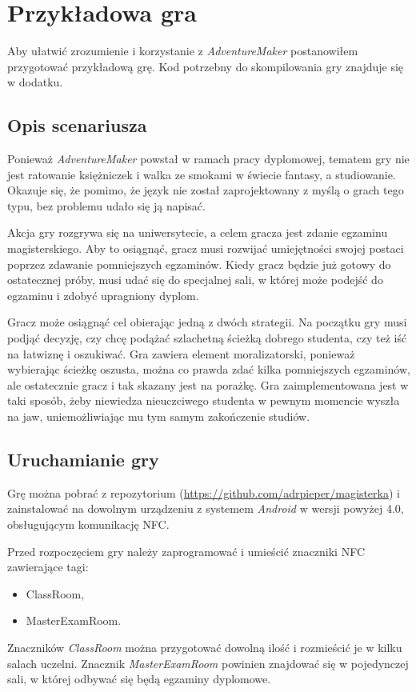 \documentclass[openright]{xmgr}
\begin{document}
\chapter{Przykładowa gra}
Aby ułatwić zrozumienie i korzystanie z \textit{AdventureMaker} postanowiłem przygotować przykładową grę. Kod potrzebny do skompilowania gry znajduje się w dodatku.

\section{Opis scenariusza}

Ponieważ \textit{AdventureMaker} powstał w ramach pracy dyplomowej, tematem gry nie jest ratowanie księżniczek i walka ze smokami w świecie fantasy, a studiowanie. Okazuje się, że pomimo, że język nie został zaprojektowany z myślą o grach tego typu, bez problemu udało się ją napisać.

Akcja gry rozgrywa się na uniwersytecie, a celem gracza jest zdanie egzaminu magisterskiego. Aby to osiągnąć, gracz musi rozwijać umiejętności swojej postaci poprzez zdawanie pomniejszych egzaminów. Kiedy gracz będzie już gotowy do ostatecznej próby, musi udać się do specjalnej sali, w której może podejść do egzaminu i zdobyć upragniony dyplom.

Gracz może osiągnąć cel obierając jedną z dwóch strategii. Na początku gry musi podjąć decyzję, czy chcę podążać szlachetną ścieżką dobrego studenta, czy też iść na łatwiznę i oszukiwać. Gra zawiera element moralizatorski, ponieważ wybierając ścieżkę oszusta, można co prawda zdać kilka pomniejszych egzaminów, ale ostatecznie gracz i tak skazany jest na porażkę. Gra zaimplementowana jest w taki sposób, żeby niewiedza nieuczciwego studenta w pewnym momencie wyszła na jaw, uniemożliwiając mu tym samym zakończenie studiów.

\section{Uruchamianie gry}

Grę można pobrać z repozytorium  (\url{https://github.com/adrpieper/magisterka}) i zainstalować na dowolnym urządzeniu z systemem \textit{Android} w wersji powyżej 4.0, obsługującym komunikację NFC. 

Przed rozpoczęciem gry należy zaprogramować i umieścić znaczniki NFC zawierające tagi:
\begin{itemize}
	\item ClassRoom,
	\item MasterExamRoom.
\end{itemize}
Znaczników \textit{ClassRoom} można przygotować dowolną ilość i rozmieścić je w kilku salach uczelni. Znacznik \textit{MasterExamRoom} powinien znajdować się w pojedynczej sali, w której odbywać się będą egzaminy dyplomowe.
\end{document}
